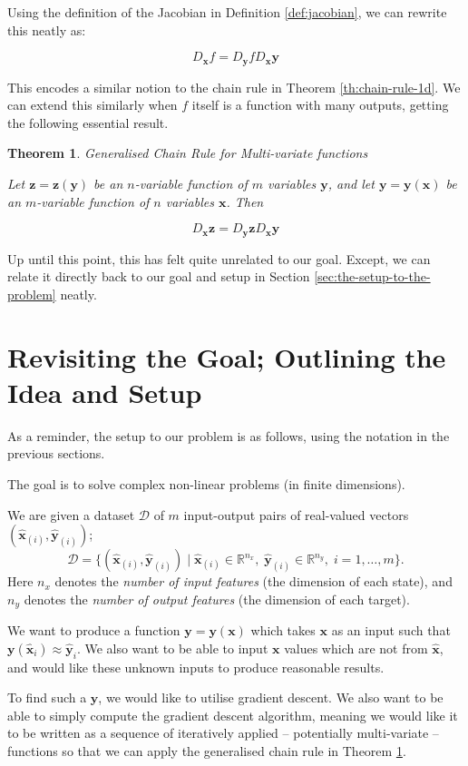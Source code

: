 \documentclass[a4paper]{article}
\theoremstyle{plain} %
\newtheorem{theorem}{Theorem}[section]
\theoremstyle{definition} %
\numberwithin{equation}{subsection}
\newcommand{\R}{\mathbb{R}}
\newcommand{\vx}{{\textbf{x}}}
\newcommand{\vy}{{\textbf{y}}}
\newcommand{\vxh}{{\widehat{\textbf{x}}}}
\newcommand{\vyh}{{\widehat{\textbf{y}}}}
\begin{document}
Using the definition of the Jacobian in Definition \ref{def:jacobian}, we can rewrite this neatly as:

\[ D_\vx f = D_\vy f D_\vx \vy \]

This encodes a similar notion to the chain rule in Theorem \ref{th:chain-rule-1d}. 
We can extend this similarly when $f$ itself is a function with many outputs, getting the following essential result.

\begin{theorem} \label{th:generalised-chain-rule}
  Generalised Chain Rule for Multi-variate functions 

  Let $\textbf{z} = \textbf{z}(\vy)$ be an $n$-variable function of $m$ variables $\vy$, and let 
  $\vy = \vy(\vx)$ be an $m$-variable function of $n$ variables $\vx$. Then 

  \[ D_\vx \textbf{z} = D_\vy \textbf{z} D_\vx \vy \]
  
\end{theorem}

Up until this point, this has felt quite unrelated to our goal. Except, we can relate it directly back to our goal and setup in Section \ref{sec:the-setup-to-the-problem} neatly.
\newpage
\section{Revisiting the Goal; Outlining the Idea and Setup} \label{sec:goal-revisited}

As a reminder, the setup to our problem is as follows, using the notation in the previous sections.

The goal is to solve complex non-linear problems (in finite dimensions).

We are given a dataset $\mathcal{D}$ of $m$ input-output pairs of real-valued vectors $(\vxh_{(i)}, \vyh_{(i)})$; 
\[
\mathcal{D} = \{(\vxh_{(i)}, \vyh_{(i)}) \mid \vxh_{(i)} \in \R^{n_x}, \; \vyh_{(i)} \in \R^{n_y}, \; i=1,\dots,m \}.
\]
Here $n_x$ denotes the \emph{number of input features} (the dimension of each state), and 
$n_y$ denotes the \emph{number of output features} (the dimension of each target).

We want to produce a function $\vy = \vy(\vx)$ which takes $\vx$ as an input such that $\vy(\vxh_{i}) \approx \vyh_{i}$. 
We also want to be able to input $\vx$ values which are not from $\vxh$, and would like these unknown inputs to produce reasonable results.

To find such a $\vy$, we would like to utilise gradient descent. We also want to be able to simply compute the gradient descent algorithm, 
meaning we would like it to be written as a sequence of iteratively applied -- potentially multi-variate -- 
functions so that we can apply the generalised chain rule in Theorem \ref{th:generalised-chain-rule}. 
\end{document}
